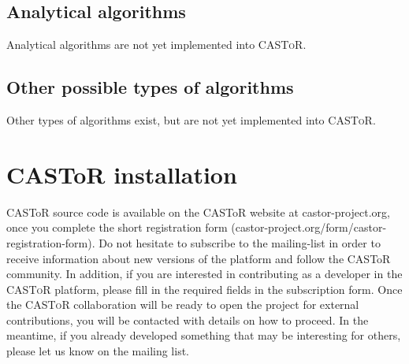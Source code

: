 \documentclass[a4paper, 11pt]{article}
\newcommand{\castor}{\textsc{CASToR}\xspace}
\begin{document}
\subsection{Analytical algorithms}

Analytical algorithms are not yet implemented into \castor.

\subsection{Other possible types of algorithms}

Other types of algorithms exist, but are not yet implemented into \castor.


\newpage
\section{CASToR installation}
\label{s_install}

CASToR source code is available on the CASToR website at castor-project.org, once you complete the short registration form (castor-project.org/form/castor-registration-form).
Do not hesitate to subscribe to the mailing-list in order to receive information about new versions of the platform and follow the CASToR community.
In addition, if you are interested in contributing as a developer in the \castor platform, please fill in the required fields in the subscription form.
Once the \castor collaboration will be ready to open the project for external contributions, you will be contacted with details on how to proceed.
In the meantime, if you already developed something that may be interesting for others, please let us know on the mailing list.
\end{document}
